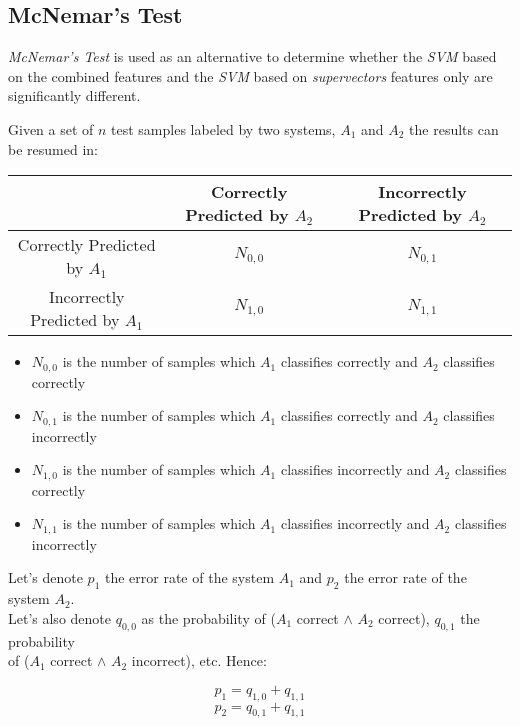 \subsection{McNemar's Test}

\textit{McNemar's Test} is used as an alternative to determine whether the \textit{SVM}
based on the combined features and the \textit{SVM} based on \textit{supervectors}
features only are significantly different.

\cite{mcnemar} Given a set of $n$ test samples labeled by two systems, $A_{1}$ and $A_{2}$
the results can be resumed in:

\begin{center}
    \begin{tabular}{ | c | c | c | }
    \hline
    & Correctly Predicted by $A_{2}$ & Incorrectly Predicted by $A_{2}$ \\ \hline
    Correctly Predicted by $A_{1}$ & $N_{0,0}$ & $N_{0,1}$ \\ \hline
    Incorrectly Predicted by $A_{1}$ & $N_{1,0}$ & $N_{1,1}$ \\ \hline
    \end{tabular}
\end{center}

\begin{itemize}
\item{$N_{0, 0}$ is the number of samples which $A_{1}$ classifies correctly and $A_{2}$ classifies correctly}
\item{$N_{0, 1}$ is the number of samples which $A_{1}$ classifies correctly and $A_{2}$ classifies incorrectly}
\item{$N_{1, 0}$ is the number of samples which $A_{1}$ classifies incorrectly and $A_{2}$ classifies correctly}
\item{$N_{1, 1}$ is the number of samples which $A_{1}$ classifies incorrectly and $A_{2}$ classifies incorrectly}
\end{itemize}

Let's denote $p_{1}$ the error rate of the system $A_{1}$ and $p_{2}$ the error rate of the
system $A_{2}$. \\
Let's also denote $q_{0,0}$ as the probability of ($A_{1}$ correct $\land$ $A_{2}$ correct),
$q_{0,1}$ the probability \\ of ($A_{1}$ correct $\land$ $A_{2}$ incorrect), etc. Hence:

\begin{multicols}{2}
  \noindent
  \begin{equation}
    p_{1} = q_{1,0} + q_{1,1}
  \end{equation}
  \begin{equation}
    p_{2} = q_{0,1} + q_{1,1}
  \end{equation}
\end{multicols}

